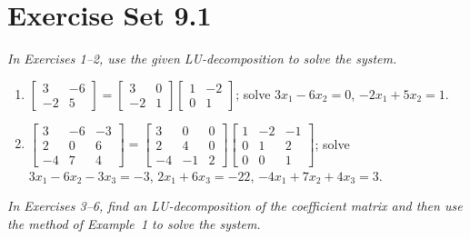 \documentclass{article}
\begin{document}
\vspace{2mm}

\section*{Exercise Set 9.1}

\noindent\textit{In Exercises 1--2, use the given LU-decomposition to solve the system.}

\begin{enumerate}
  \item $\begin{bmatrix}3&-6\\-2&5\end{bmatrix}
        = \begin{bmatrix}3&0\\-2&1\end{bmatrix}
          \begin{bmatrix}1&-2\\0&1\end{bmatrix}$;\quad
        solve $3x_1 - 6x_2 = 0$,\; $-2x_1 + 5x_2 = 1$.

  \item $\begin{bmatrix}3&-6&-3\\2&0&6\\-4&7&4\end{bmatrix}
        = \begin{bmatrix}3&0&0\\2&4&0\\-4&-1&2\end{bmatrix}
          \begin{bmatrix}1&-2&-1\\0&1&2\\0&0&1\end{bmatrix}$;\quad
        solve $3x_1-6x_2-3x_3=-3$,\; $2x_1+6x_3=-22$,\; $-4x_1+7x_2+4x_3=3$.

\end{enumerate}

\noindent\textit{In Exercises 3--6, find an LU-decomposition of the coefficient matrix
and then use the method of Example~1 to solve the system.}
\end{document}
